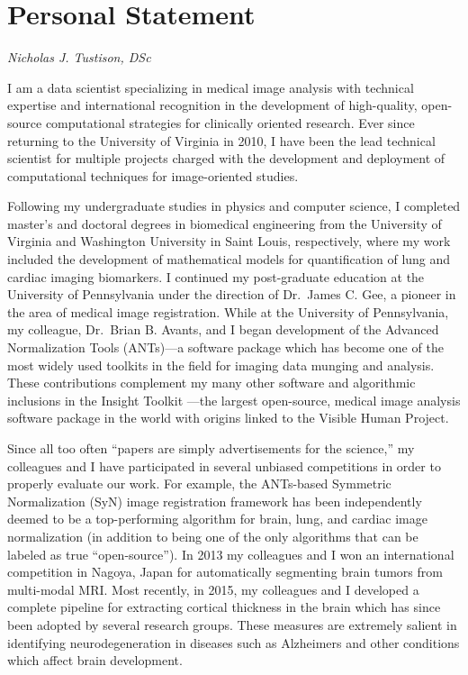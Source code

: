 \documentclass[12pt,]{article}
\title{}
\author{}
\date{}
\begin{document}
\maketitle


\section{Personal Statement}\label{personal-statement}

\emph{Nicholas J. Tustison, DSc}

I am a data scientist specializing in medical image analysis with
technical expertise and international recognition in the development of
high-quality, open-source computational strategies for clinically
oriented research. Ever since returning to the University of Virginia in
2010, I have been the lead technical scientist for multiple projects
charged with the development and deployment of computational techniques
for image-oriented studies.

Following my undergraduate studies in physics and computer science, I
completed master's and doctoral degrees in biomedical engineering from
the University of Virginia and Washington University in Saint Louis,
respectively, where my work included the development of mathematical
models for quantification of lung and cardiac imaging biomarkers. I
continued my post-graduate education at the University of Pennsylvania
under the direction of Dr.~James C. Gee, a pioneer in the area of
medical image registration. While at the University of Pennsylvania, my
colleague, Dr.~Brian B. Avants, and I began development of the Advanced
Normalization Tools (ANTs)---a software package which has become one of
the most widely used toolkits in the field for imaging data munging and
analysis. These contributions complement my many other software and
algorithmic inclusions in the Insight Toolkit ---the largest
open-source, medical image analysis software package in the world with
origins linked to the Visible Human Project.

Since all too often ``papers are simply advertisements for the
science,'' my colleagues and I have participated in several unbiased
competitions in order to properly evaluate our work. For example, the
ANTs-based Symmetric Normalization (SyN) image registration framework
has been independently deemed to be a top-performing algorithm for
brain, lung, and cardiac image normalization (in addition to being one
of the only algorithms that can be labeled as true ``open-source''). In
2013 my colleagues and I won an international competition in Nagoya,
Japan for automatically segmenting brain tumors from multi-modal MRI.
Most recently, in 2015, my colleagues and I developed a complete
pipeline for extracting cortical thickness in the brain which has since
been adopted by several research groups. These measures are extremely
salient in identifying neurodegeneration in diseases such as Alzheimers
and other conditions which affect brain development.
\end{document}
